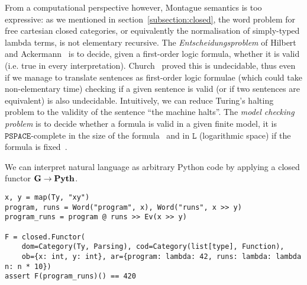 From a computational perspective however, Montague semantics is too expressive: as we mentioned in section~\ref{subsection:closed}, the word problem for free cartesian closed categories, or equivalently the normalisation of simply-typed lambda terms, is not elementary recursive.
The \emph{Entscheidungsproblem} of Hilbert and Ackermann~\cite{HilbertAckerman28} is to decide, given a first-order logic formula, whether it is valid (i.e. true in every interpretation).
Church~\cite{Church36} proved this is undecidable, thus even if we manage to translate sentences as first-order logic formulae (which could take non-elementary time) checking if a given sentence is valid (or if two sentences are equivalent) is also undecidable.
Intuitively, we can reduce Turing's halting problem to the validity of the sentence ``the machine halts''.
The \emph{model checking problem} is to decide whether a formula is valid in a given finite model, it is $\mathtt{PSPACE}$-complete in the size of the formula~\cite[Theorem~4.3]{Gradel02} and in $\mathtt{L}$ (logarithmic space) if the formula is fixed~\cite[Corollary~4.5]{Gradel02}.

\begin{example}
We can interpret natural language as arbitrary Python code by applying a closed functor $\mathbf{G} \to \mathbf{Pyth}$.

\begin{verbatim}
x, y = map(Ty, "xy")
program, runs = Word("program", x), Word("runs", x >> y)
program_runs = program @ runs >> Ev(x >> y)

F = closed.Functor(
    dom=Category(Ty, Parsing), cod=Category(list[type], Function),
    ob={x: int, y: int}, ar={program: lambda: 42, runs: lambda: lambda n: n * 10})
assert F(program_runs)() == 420
\end{verbatim}
\end{example}

